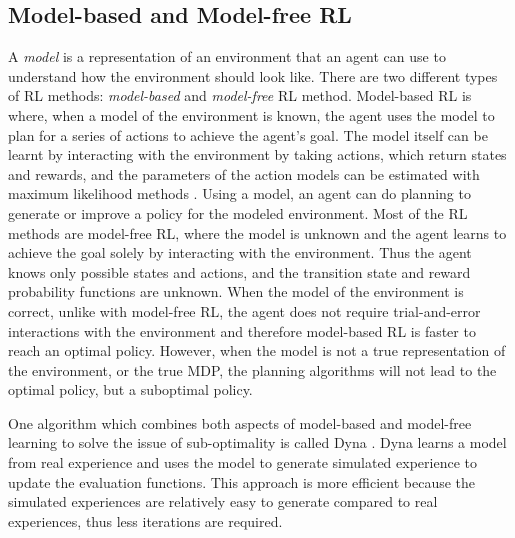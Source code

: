 \documentclass[11pt,twoside]{report}
\theoremstyle{plain}
\theoremstyle{definition}
\DeclareMathOperator{\E}{\mathbb{E}}
\begin{document}

%
%
%
%

\subsection{Model-based and Model-free RL}
\label{model_base_model_free_subsection}
A \textit{model} is a representation of an environment that an agent can use to understand how the environment should look like. 
There are two different types of RL methods: \textit{model-based} and \textit{model-free} RL method. 
Model-based RL is where, when a model of the environment is known, the agent uses the model to plan for a series of actions to achieve the agent's goal. 
The model itself can be learnt by interacting with the environment by taking actions, which return states and rewards, and the parameters of the action models can be estimated with maximum likelihood methods \cite{Ray2010}.
Using a model, an agent can do planning to generate or improve a policy for the modeled environment. 
Most of the RL methods are model-free RL, where the model is unknown and the agent learns to achieve the goal solely by interacting with the environment. 
Thus the agent knows only possible states and actions, and the transition state and reward probability functions are unknown.
When the model of the environment is correct, unlike with model-free RL, the agent does not require trial-and-error interactions with the environment and therefore model-based RL is faster to reach an optimal policy. 
However, when the model is not a true representation of the environment, or the true MDP, the planning algorithms will not lead to the optimal policy, but a suboptimal policy.

One algorithm which combines both aspects of model-based and model-free learning to solve the issue of sub-optimality is called Dyna \cite{Sutton1990}.
Dyna learns a model from real experience and uses the model to generate simulated experience to update the evaluation functions.
This approach is more efficient because the simulated experiences are relatively easy to generate compared to real experiences, thus less iterations are required.
\end{document}

